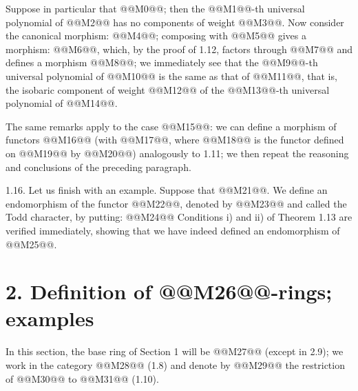 Suppose in particular that @@M0@@; then the @@M1@@-th universal polynomial of @@M2@@ has no components of weight @@M3@@. Now consider the canonical morphism: @@M4@@; composing with @@M5@@ gives a morphism: @@M6@@, which, by the proof of 1.12, factors through @@M7@@ and defines a morphism @@M8@@; we immediately see that the @@M9@@-th universal polynomial of @@M10@@ is the same as that of @@M11@@, that is, the isobaric component of weight @@M12@@ of the @@M13@@-th universal polynomial of @@M14@@.

The same remarks apply to the case @@M15@@: we can define a morphism of functors @@M16@@ (with @@M17@@, where @@M18@@ is the functor defined on @@M19@@ by @@M20@@) analogously to 1.11; we then repeat the reasoning and conclusions of the preceding paragraph.

1.16. Let us finish with an example. Suppose that @@M21@@. We define an endomorphism of the functor @@M22@@, denoted by @@M23@@ and called the Todd character, by putting:
@@M24@@
Conditions i) and ii) of Theorem 1.13 are verified immediately, showing that we have indeed defined an endomorphism of @@M25@@.

\section*{2. Definition of @@M26@@-rings; examples}

In this section, the base ring of Section 1 will be @@M27@@ (except in 2.9); we work in the category @@M28@@ (1.8) and denote by @@M29@@ the restriction of @@M30@@ to @@M31@@ (1.10).

